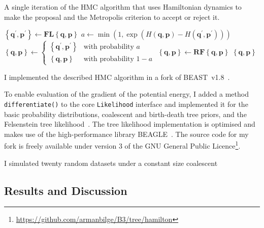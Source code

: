 \documentclass{article}
\renewcommand{\vec}[1]{\ensuremath{\boldsymbol{\mathbf{#1}}}}
\newcommand{\op}[1]{\ensuremath{\boldsymbol{\mathbf{#1}}}}
\begin{document}
    \begin{algorithm}
        \caption{A single iteration of the \acl{HMC} algorithm that uses
                 Hamiltonian dynamics to make the proposal and the Metropolis
                 criterion to accept or reject it.}
        \begin{algorithmic}[1]
        \Function {HamiltonUpdate}{$\left\{\vec{q},\vec{p}\right\}$}
            \State $\left\{\vec{q}^\prime, \vec{p}^\prime\right\}
                \leftarrow \op{F}\op{L}\left\{\vec{q},\vec{p}\right\}$
            \State $a \leftarrow \min\left(1,
                \exp\left(
                    H\left(\vec{q}, \vec{p}\right) - H\left(\vec{q}^\prime,
                        \vec{p}^\prime\right)\right)\right)$
            \State $\left\{\vec{q},\vec{p}\right\} \leftarrow
                \begin{cases}
                    \left\{\vec{q}^\prime, \vec{p}^\prime\right\}
                        & \text{with probability } a \\
                    \left\{\vec{q},\vec{p}\right\}
                        & \text{with probability } 1 - a
                \end{cases}$
            \State $\left\{\vec{q},\vec{p}\right\} \leftarrow
                        \op{R}\op{F}\left\{\vec{q},\vec{p}\right\}$
            \State \Return $\left\{\vec{q},\vec{p}\right\}$
        \EndFunction
        \end{algorithmic}
    \end{algorithm}

    I implemented the described \ac{HMC} algorithm in a fork of
        BEAST~v1.8~\cite{Dru+12}.

    To enable evaluation of the gradient of the potential energy, I added a
        method \texttt{differentiate()} to the core \texttt{Likelihood}
        interface and implemented it for the basic probability distributions,
        coalescent and birth-death tree priors, and the Felsenstein tree
        likelihood~\cite{Fel81}.
    The tree likelihood implementation is optimised and makes use of the
        high-performance library BEAGLE~\cite{Ayr+12}.
    The source code for my fork is freely available under version 3 of the GNU
        General Public
        Licence\footnote{\url{https://github.com/armanbilge/B3/tree/hamilton}}.

    I simulated twenty random datasets under a constant size coalescent

    \singlespacing

    \subsection*{Results and Discussion}
\end{document}
